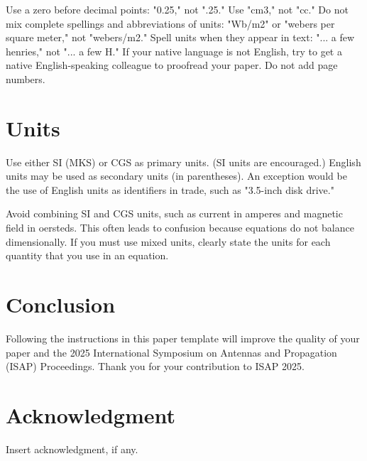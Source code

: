 \documentclass[conference,a4paper]{isap2025}
\begin{document}
Use a zero before decimal points: "0.25," not ".25." Use "cm3," not "cc." Do not mix complete spellings and abbreviations of units: "Wb/m2" or "webers per square meter," not "webers/m2." Spell units when they appear in text:  "... a few henries," not "... a few H." If your native language is not English, try to get a native English-speaking colleague to proofread your paper.  Do not add page numbers.


\section{Units}

Use either SI (MKS) or CGS as primary units. (SI units are encouraged.) English units may be used as secondary units (in parentheses). An exception would be the use of English units as identifiers in trade, such as "3.5-inch disk drive."

Avoid combining SI and CGS units, such as current in amperes and magnetic field in oersteds. This often leads to confusion because equations do not balance dimensionally. If you must use mixed units, clearly state the units for each quantity that you use in an equation.


\section{Conclusion}

Following the instructions in this paper template will improve the quality of your paper and the 2025 International Symposium on Antennas and Propagation (ISAP) Proceedings. Thank you for your contribution to ISAP 2025. 


\section*{Acknowledgment}

Insert acknowledgment, if any.

\end{document}

